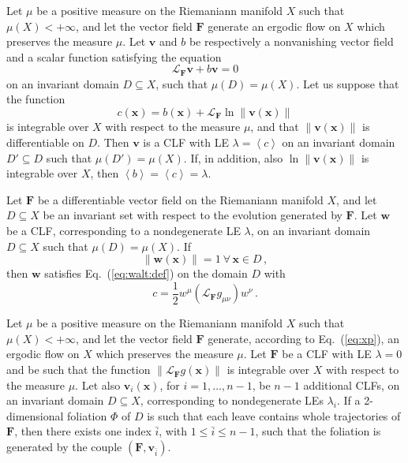\documentclass[10pt,a4paper]{amsart}
\newcommand{\vect}[1]{\boldsymbol{#1}}
\begin{document}
\begin{proposition}
  \label{prop:alt:def}
Let $\mu$ be a positive measure on the Riemaniann manifold $X$ such
that $\mu(X)<+\infty$, and let the vector field $\vect{F}$ generate an
ergodic flow on $X$ which preserves the measure $\mu$.  Let $\vect{v}$
and $b$ be respectively a nonvanishing vector field and a scalar
function satisfying the equation
\[
 \mathcal{L}_{\vect{F}} \vect{v} + b \vect v = 0 
\]
on an invariant domain \mbox{$D\subseteq X$}, such that
$\mu(D)=\mu(X)$. Let us suppose that the function
\begin{equation}\label{eq:bb2}
c(\vect{x})=b(\vect{x})+\mathcal{L}_{\vect{F}}
\ln \lVert \vect{v}\left(\vect {x}\right) \rVert 
\end{equation}
is integrable over $X$ with respect to the measure $\mu$, and
that $\lVert \vect{v}\left(\vect {x}\right) \rVert$ is differentiable
on $D$. Then $\vect{v}$ is a CLF with LE $\lambda=\left<c\right>$ on
an invariant domain $D'\subseteq D$ such that $\mu(D')=\mu(X)$. If, in
addition, also $\ln \lVert \vect{v}\left(\vect {x}\right) \rVert$ is
integrable over $X$, then $\left<b\right>=\left<c\right>=\lambda$.
\end{proposition}

\begin{proposition}\label{prop:blim}
Let $\vect{F}$ be a differentiable vector field on the Riemaniann manifold
$X$, and let $D\subseteq X$ be an invariant set with respect to the evolution
generated by $\vect{F}$. Let $\vect{w}$
be a CLF, corresponding to a nondegenerate LE $\lambda$, on an
invariant domain \mbox{$D\subseteq X$} such that $\mu(D)=\mu(X)$. If
\begin{equation}\label{eq:wnorm1}
\lVert \vect{w}(\vect{x})\rVert=1 \ \forall\,\vect{x}\in D\,,
\end{equation}
then $\vect w$
satisfies Eq.~(\ref{eq:walt:def}) on the domain $D$ with 
\begin{equation}\label{eq:blie}
c= \frac 12
w^\mu \left(\mathcal{L}_{\vect{F}} g_{\mu\nu}\right) w^\nu\,.
\end{equation}
\end{proposition}

\begin{proposition} \label{prop:geo:foliation:CLF}
Let $\mu$ be a positive measure on the Riemaniann manifold $X$
such that $\mu(X)<+\infty$, and
let the vector field $\vect{F}$ generate, according to Eq.~(\ref{eq:xp}), 
an ergodic flow on $X$ which preserves the measure $\mu$.
Let $\vect{F}$ be a CLF with LE $\lambda=0$ and be such that
the function $\lVert\mathcal{L}_{\vect{F}} g(\vect{x})\rVert$
is integrable over $X$ with respect to the measure $\mu$.
Let also
  $\vect{v}_i(\vect{x})$, for $i=1, \dots, n-1$, 
be $n-1$ additional CLFs, on an invariant domain
  $D\subseteq X$, corresponding to nondegenerate LEs $\lambda_i$.
  If a 2-dimensional foliation $\Phi$ of $D$ is such that each leave contains whole
  trajectories of $\vect{F}$, then there exists one index $\bar i$,
with $1\leq \bar i\leq n-1$, such that the foliation is generated by 
the couple $(\vect{F},\vect{v}_{\bar i})$.
\end{proposition}
\end{document}
